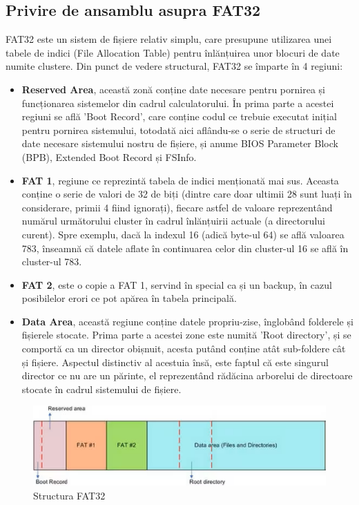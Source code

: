 \subsection{Privire de ansamblu asupra FAT32}

FAT32 este un sistem de fișiere relativ simplu, care presupune utilizarea unei tabele de indici (File Allocation Table) pentru înlănțuirea unor blocuri de date numite clustere. Din punct de vedere structural, FAT32 se împarte în 4 regiuni:

\begin{itemize}
  \item \textbf{Reserved Area}, această zonă conține date necesare pentru pornirea și funcționarea sistemelor din cadrul calculatorului. În prima parte a acestei regiuni se află 'Boot Record', care conține codul ce trebuie executat inițial pentru pornirea sistemului, totodată aici aflându-se o serie de structuri de date necesare sistemului nostru de fișiere, și anume BIOS Parameter Block (BPB), Extended Boot Record și FSInfo.
  
 \item \textbf{FAT 1}, regiune ce reprezintă tabela de indici menționată mai sus. Aceasta conține o serie de valori de 32 de biți (dintre care doar ultimii 28 sunt luați în considerare, primii 4 fiind ignorați), fiecare astfel de valoare reprezentând numărul următorului cluster în cadrul înlănțuirii actuale (a directorului curent). Spre exemplu, dacă la indexul 16 (adică byte-ul 64) se află valoarea 783, înseamnă că datele aflate în continuarea celor din cluster-ul 16 se află în cluster-ul 783.
 
 \item \textbf{FAT 2}, este o copie a FAT 1, servind în special ca și un backup, în cazul posibilelor erori ce pot apărea în tabela principală.
 
 \item \textbf{Data Area}, această regiune conține datele propriu-zise, înglobând folderele și fișierele stocate. Prima parte a acestei zone este numită 'Root directory', și se comportă ca un director obișnuit, acesta putând conține atât sub-foldere cât și fișiere. Aspectul distinctiv al acestuia însă, este faptul că este singurul director ce nu are un părinte, el reprezentând rădăcina arborelui de directoare stocate în cadrul sistemului de fișiere.  
\end{itemize}


\begin{figure}[h]
    \centering
    \includegraphics[width=1.0\linewidth]{images/2.4.png}
    \caption{Structura FAT32}
    \label{fig:enter-label}
\end{figure}

